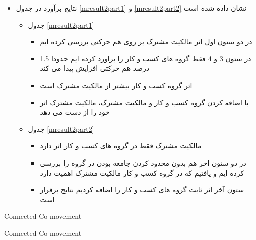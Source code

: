 \documentclass[12pt, a4paper]{article}
\begin{document}
\begin{itemize}
	\item 
	نتایج برآورد در جدول 
	\ref{mresult2part1}
	و
	\ref{mresult2part2}
	نشان داده شده است
	
\begin{itemize}
\item
جدول
\ref{mresult2part1}
\begin{itemize}

	\item 
	در دو ستون اول  اثر مالکیت مشترک بر روی هم حرکتی بررسی کرده ایم
	\item 
		در ستون 3 و 4 فقط گروه های کسب و کار را براورد کرده ایم حدودا 1.5 درصد هم حرکتی افزایش پیدا می کند
	\item 
	اثر گروه کسب و کار بیشتر از مالکیت مشترک است
	\item 
	با اضافه کردن گروه کسب و کار و مالکیت مشترک، مالکیت مشترک اثر خود را از دست می دهد
\end{itemize}
	
\item
جدول
\ref{mresult2part2}
\begin{itemize}
	\item 
	مالکیت مشترک فقط در گروه های کسب و کار اثر دارد
	\item
	در دو ستون اخر هم بدون محدود کردن جامعه بودن در گروه را بررسی کرده ایم و یافتیم که در گروه کسب و کار مالکیت مشترک اهمیت دارد
	\item
	ستون آخر اثر ثابت گروه های کسب و کار را اضافه کردیم نتایج برقرار است
\end{itemize}
	
\end{itemize} 
\end{itemize}

	{\begin{table}[p]
	\centering
	\caption{Connected Co-movement}
	\label{mresult2part1}
	\resizebox{1\textwidth}{!}{
		\begin{LTR}
			\lr{}
		\end{LTR}
	}
\end{table}}

	{\begin{table}[p]
	\centering
	\caption{Connected Co-movement}
	\label{mresult2part2}
	\resizebox{1\textwidth}{!}{
		\begin{LTR}
			\lr{}
		\end{LTR}
	}
\end{table}}
\end{document}
